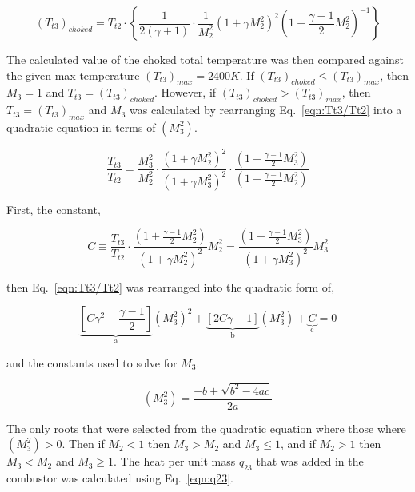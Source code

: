 \documentclass[conf]{new-aiaa} %
\begin{document}
\begin{equation}
    \label{eqn:Tt3choked}
    \left(T_{t3}\right)_{choked}=T_{t2}\cdot\left\{\frac{1}{2(\gamma+1)}\cdot\frac{1}{M_2^2}\left(1+\gamma M_2^2\right)^2\left(1+\frac{\gamma-1}{2}M_2^2\right)^{-1}\right\}
\end{equation}

The calculated value of the choked total temperature was then compared against the given max temperature $\left(T_{t3}\right)_{max}=2400K$. If $\left(T_{t3}\right)_{choked}\leq\left(T_{t3}\right)_{max}$, then $M_3=1$ and $T_{t3}=\left(T_{t3}\right)_{choked}$. However, if $\left(T_{t3}\right)_{choked}>\left(T_{t3}\right)_{max}$, then $T_{t3}=\left(T_{t3}\right)_{max}$ and $M_3$ was calculated by rearranging Eq.~\eqref{eqn:Tt3/Tt2} into a quadratic equation in terms of $\left(M_3^2\right)$.

\begin{equation}
    \label{eqn:Tt3/Tt2}
    \frac{T_{t3}}{T_{t2}}=\frac{M_3^2}{M_2^2}\cdot\frac{\left(1+\gamma M_2^2\right)^2}{\left(1+\gamma M_3^2\right)^2}\cdot\frac{\left(1+\frac{\gamma-1}{2}M_3^2\right)}{\left(1+\frac{\gamma-1}{2}M_2^2\right)}
\end{equation}

First, the constant,

\begin{equation}
    \label{eqn:C}
    C\equiv\frac{T_{t3}}{T_{t2}}\cdot\frac{\left(1+\frac{\gamma-1}{2}M_2^2\right)}{\left(1+\gamma M_2^2\right)^2}M_2^2=\frac{\left(1+\frac{\gamma-1}{2}M_3^2\right)}{\left(1+\gamma M_3^2\right)^2}M_3^2
\end{equation}

then Eq.~\eqref{eqn:Tt3/Tt2} was rearranged into the quadratic form of,

\begin{equation}
    \label{eqn:quad}
    \underbrace{\left[C\gamma^2-\frac{\gamma-1}{2}\right]}_\text{a}
    \left(M_3^2\right)^2+
    \underbrace{\left[2C\gamma-1\right]}_\text{b}
    \left(M_3^2\right)+
    \underbrace{C}_\text{c}
    =0
\end{equation}

and the constants used to solve for $M_3$.

\begin{equation}
    \label{eqn:quadeq}
    \left(M_3^2\right)=\frac{-b\pm\sqrt{b^2-4ac}}{2a}
\end{equation}

The only roots that were selected from the quadratic equation where those where $\left(M_3^2\right)>0$. Then if $M_2<1$ then $M_3>M_2$ and $M_3\leq1$, and if $M_2>1$ then $M_3<M_2$ and $M_3\geq1$. The heat per unit mass $q_{23}$ that was added in the combustor was calculated using Eq.~\eqref{eqn:q23}.
\end{document}
